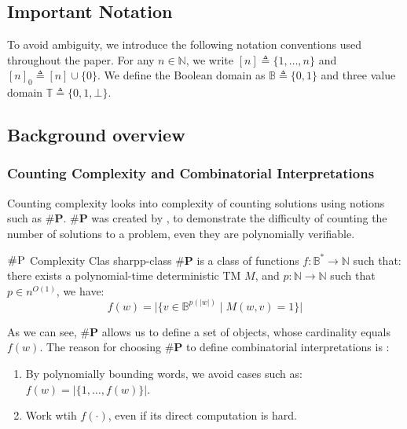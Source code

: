 
\subsection{Important Notation}

To avoid ambiguity, we introduce the following notation conventions used throughout the paper.
For any $n \in \mathbb{N}$, we write $[n] \triangleq \{1, \ldots, n\}$  and $[n]_0 \triangleq [n] \cup \{0\}$. 
We define the Boolean domain as $\mathbb{B} \triangleq \{0, 1\}$ and
three value domain $\mathbb{T} \triangleq \{0, 1, \bot\}$.


\subsection{Background overview}


\subsubsection{Counting Complexity and Combinatorial Interpretations}

Counting complexity looks into complexity of counting solutions using notions
such as $\textbf{\#P}$.
$\textbf{\#P}$ was created by \cite{valiant_ComplexityComputingPermanent_1979},
to demonstrate the difficulty of counting the number of solutions to a problem,
even they are polynomially verifiable.

\begin{definitionbox}{$\textsc{\#P}$ Complexity Clas \cite{valiant_ComplexityComputingPermanent_1979}}{sharpp-class}
    $\textbf{\#P}$ is a class of functions $f: \mathbb{B}^* \to \mathbb{N}$
    such that: there
    exists a polynomial-time deterministic TM $M$, and
    $p : \mathbb{N} \to \mathbb{N}$ such that $p \in n^{O(1)}$, we have:
    $$
    f(w) = \Big|\Big\{v \in \mathbb{B}^{p(|w|)} \mid M(w, v) =1 \Big\}\Big|
    $$
\end{definitionbox}


As we can see, $\textbf{\#P}$ allows us to define a set of objects,
whose cardinality equals $f(w)$. The reason for choosing
$\textbf{\#P}$ to define combinatorial interpretations is \cite{ikenmeyer_PositivitySymmetricGroup_2024}: 

\begin{enumerate}
    \item By polynomially bounding words, we avoid cases such as: $f(w) = |\{1, \hdots, f(w)\}|$.
    \item Work wtih $f(\cdot)$, even if its direct computation is hard.
\end{enumerate}



